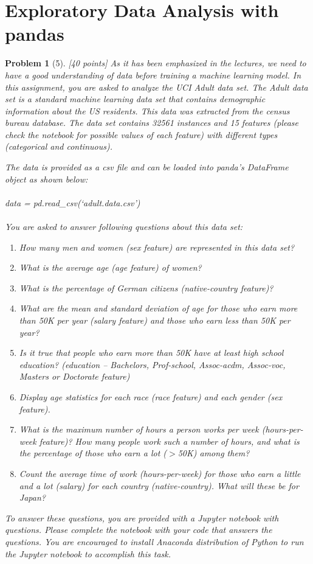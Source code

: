 \documentclass[11pt]{article}
\theoremstyle{quest}
\newtheorem*{problem}{Problem}
\begin{document}
\section*{Exploratory Data Analysis with \textsf{pandas}}
\begin{problem}[5]
[40 points] As it has been emphasized in the lectures, we need to have a good understanding of data before training a machine learning model. In this assignment, you are asked to analyze the UCI Adult data set. The Adult data set is a standard machine learning data set that contains demographic information about the US residents. This data was extracted from the census bureau database. The data set contains 32561 instances and 15 features (please check the notebook for possible values of each feature) with different types (categorical and continuous).

The data is provided as a \textsf{csv} file and can be loaded into \textsf{panda}'s \textsf{DataFrame} object as shown below:
\\\\
\textsf{data = pd.read\_csv(`adult.data.csv')}
\\\\
You are asked to answer following questions about this data set:
\begin{enumerate}
    \item How many men and women (sex feature) are represented in this data set?
    \item What is the average age (age feature) of women?
    \item What is the percentage of German citizens (native-country feature)?
    \item What are the mean and standard deviation of age for those who earn more than 50K per year (salary feature) and those who earn less than 50K per year?
    \item Is it true that people who earn more than 50K have at least high school education? (education – Bachelors, Prof-school, Assoc-acdm, Assoc-voc, Masters or Doctorate feature)
    \item Display age statistics for each race (race feature) and each gender (sex feature).
    \item What is the maximum number of hours a person works per week (hours-per-week feature)? How many people work such a number of hours, and what is the percentage of those who earn a lot ($>$50K) among them?
    \item Count the average time of work (hours-per-week) for those who earn a little and a lot (salary) for each country (native-country). What will these be for Japan?
\end{enumerate}

To answer these questions, you are provided with a \textsf{Jupyter} notebook with questions. Please complete the notebook with your code that answers the questions. You are encouraged to install \textsf{Anaconda} distribution of Python to run the \textsf{Jupyter} notebook to accomplish this task.

\end{problem}
\end{document}
